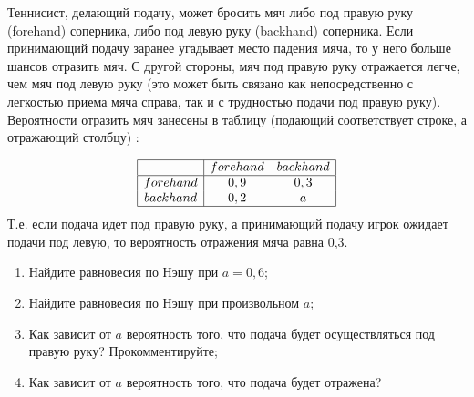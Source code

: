 \begin{problem}
\begin{source}
\cite[4.18]{gintis:gte}
\end{source}
Теннисист, делающий подачу, может бросить мяч либо под правую руку (forehand) соперника, либо под левую руку (backhand) соперника. Если принимающий подачу заранее угадывает место падения мяча, то у него больше шансов отразить мяч. С другой стороны, мяч под правую руку отражается легче, чем мяч под левую руку (это может быть связано как непосредственно с легкостью приема мяча справа, так и с трудностью подачи под правую руку). Вероятности отразить мяч занесены в таблицу (подающий соответствует строке, а отражающий столбцу) :\par
\[\begin{array}{|c|cc|}
\hline
{} & {forehand} & {backhand} \\
\hline {forehand} & {0,9} & {0,3} \\
{backhand} & {0,2} & {a} \\
\hline
\end{array}\]
Т.е. если подача идет под правую руку, а принимающий подачу игрок ожидает подачи под левую, то вероятность отражения мяча равна 0,3.
\begin{enumerate}
\item  Найдите равновесия по Нэшу при  $a=0,6$;\par
\item Найдите равновесия по Нэшу при произвольном  $a$;\par
\item  Как зависит от  $a$  вероятность того, что подача будет осуществляться под правую руку? Прокомментируйте;\par
\item Как зависит от  $a$  вероятность того, что подача будет отражена?\par
\end{enumerate}


\begin{sol}

\end{sol}
\end{problem}






